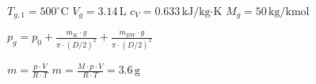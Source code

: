 \( T_{g,1} = 500^\circ \text{C} \)  
\( V_g = 3.14 \, \text{L} \)  
\( c_V = 0.633 \, \text{kJ/kg·K} \)  
\( M_g = 50 \, \text{kg/kmol} \)  

\( p_g = p_0 + \frac{m_K \cdot g}{\pi \cdot (D/2)^2} + \frac{m_{EW} \cdot g}{\pi \cdot (D/2)^2} \)  

\( m = \frac{p \cdot V}{R \cdot T} \)  
\( m = \frac{M \cdot p \cdot V}{R \cdot T} = 3.6 \, \text{g} \)
